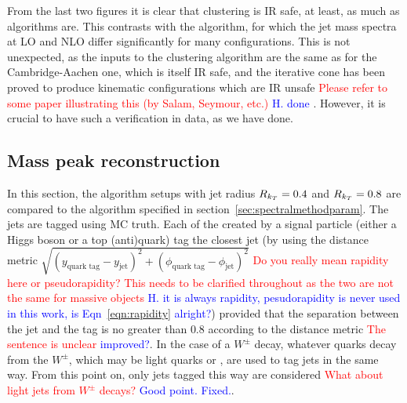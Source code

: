 From  the last two figures it is clear that \spectral{} clustering  is IR safe, at least, as much as \genkt{} algorithms are.
This contrasts with the \itercone{} algorithm, for which the jet mass spectra at LO and NLO 
differ significantly for many configurations.
This is not unexpected, as the inputs to the \spectral{} clustering algorithm 
are the same as for the Cambridge-Aachen one, 
which is itself IR safe, and the iterative cone has been  proved to produce kinematic configurations which are IR unsafe \cite{Salam:2007xv} {\textcolor{red}{Please refer to some paper illustrating this (by Salam, Seymour, etc.)} \textcolor{blue}{H. done}} .
However, it is crucial to have such a verification in data, as we have done.


\subsection{Mass peak reconstruction}
In this section, the \antikt{} algorithm setups with jet radius \(R_{k_T}{} = 0.4\) and \(R_{k_T}{} = 0.8\)
are compared to the \spectral{} algorithm specified in section~\ref{sec:spectralmethodparam}. The jets are tagged using MC truth.
Each of the  created by a signal particle (either a Higgs boson or a top (anti)quark)
tag the closest jet (by using the distance metric \(\sqrt{(y_\text{quark tag} - y_\text{jet})^2 + (\phi_\text{quark tag} - \phi_\text{jet})^2}\)
{\textcolor{red}{Do you really mean rapidity here or pseudorapidity? This needs to be clarified throughout as the two are not the same for massive objects} \textcolor{blue}{H. it is always rapidity, pesudorapidity is never used in this work, is Eqn~\ref{eqn:rapidity} alright?}})
provided that the separation between the jet and the tag is no greater than \(0.8\) according to the distance metric {\textcolor{red}{The sentence is unclear} \textcolor{blue}{improved?}}.
In the case of a \(W^\pm\) decay, whatever quarks decay from the \(W^\pm\), which may be light quarks or , are used to tag jets in the same way.
From this point on, only jets tagged this way are considered {\textcolor{red}{What about light jets from $W^\pm$ decays?} \textcolor{blue}{Good point. Fixed.}}.


